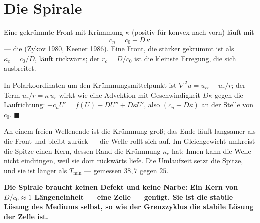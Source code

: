 \section{Die Spirale}

\begin{merksatz}
Eine gekrümmte Front mit Krümmung $\kappa$ (positiv für konvex nach vorn) läuft mit
\[ c_{n} = c_{0} - D\,\kappa \]
--- die  (Zykov 1980, Keener 1986). Eine Front, die stärker gekrümmt ist als $\kappa_{c} = c_{0}/D$, läuft rückwärts; der  $r_{c} = D/c_{0}$ ist die kleinste Erregung, die sich ausbreitet.

In Polarkoordinaten um den Krümmungsmittelpunkt ist $\nabla^{2}u = u_{rr} + u_{r}/r$; der Term $u_{r}/r = \kappa\,u_{r}$ wirkt wie eine Advektion mit Geschwindigkeit $D\kappa$ gegen die Laufrichtung: $-c_{n}U' = f(U) + DU'' + D\kappa U'$, also $(c_{n} + D\kappa)$ an der Stelle von $c_{0}$. $\blacksquare$

An einem freien Wellenende ist die Krümmung groß; das Ende läuft langsamer als die Front und bleibt zurück --- die Welle rollt sich auf. Im Gleichgewicht umkreist die Spitze einen Kern, dessen Rand die Krümmung $\kappa_{c}$ hat: Innen kann die Welle nicht eindringen, weil sie dort rückwärts liefe. Die Umlaufzeit setzt die Spitze, und sie ist länger als $T_{\min}$ --- gemessen $38{,}7$ gegen $25$.

\begin{center}
\begin{minipage}{0.9\textwidth}
\textbf{Die Spirale braucht keinen Defekt und keine Narbe: Ein Kern von $D/c_{0}\approx 1$ Längeneinheit --- eine Zelle --- genügt. Sie ist die stabile Lösung des Mediums selbst, so wie der Grenzzyklus die stabile Lösung der Zelle ist.}
\end{minipage}
\end{center}

\begin{center}
\begin{minipage}{0.88\textwidth}
\end{minipage}
\end{center}
\end{merksatz}

